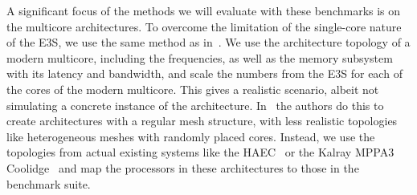 A significant focus of the methods we will evaluate with these benchmarks is on the multicore architectures.
To overcome the limitation of the single-core nature of the \ac{E3S}, we use the same method as in~\cite{schwarzer2017symmetry}.
We use the architecture topology of a modern multicore, including the frequencies, as well as the memory subsystem with its latency and bandwidth, and scale the numbers from the \ac{E3S} for each of the cores of the modern multicore.
This gives a realistic scenario, albeit not simulating a concrete instance of the architecture.
In~\cite{schwarzer2017symmetry} the authors do this to create architectures with a regular mesh structure, with less realistic topologies like heterogeneous meshes with randomly placed cores.
Instead, we use the topologies from actual existing systems like the HAEC~\cite{HAEC} or the Kalray MPPA3 Coolidge~\cite{coolidge} and map the processors in these architectures to those in the benchmark suite.